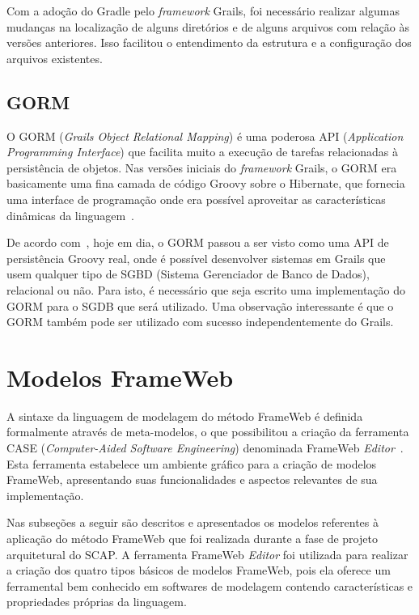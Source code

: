 Com a adoção do Gradle pelo \textit{framework} Grails, foi necessário realizar algumas mudanças na localização de alguns diretórios e de alguns arquivos com relação às versões anteriores. Isso facilitou o entendimento da estrutura e a configuração dos arquivos existentes.

\subsection{GORM}
\label{sec-projeto-gorm}

O GORM (\textit{Grails Object Relational Mapping}) é uma poderosa API (\textit{Application Programming Interface}) que facilita muito a execução de tarefas relacionadas à persistência de objetos. Nas versões iniciais do \textit{framework} Grails, o GORM era basicamente uma fina camada de código Groovy sobre o Hibernate, que fornecia uma interface de programação onde era possível aproveitar as características dinâmicas da linguagem~\cite{weissmann:fgapdw15}.

De acordo com~, hoje em dia, o GORM passou a ser visto como uma API de persistência Groovy real, onde é possível desenvolver sistemas em Grails que usem qualquer tipo de SGBD (Sistema Gerenciador de Banco de Dados), relacional ou não. Para isto, é necessário que seja escrito uma implementação do GORM para o SGDB que será utilizado. Uma observação interessante é que o GORM também pode ser utilizado com sucesso independentemente do Grails.  

\section{Modelos FrameWeb}
\label{sec-projeto-modelos-frameweb}

A sintaxe da linguagem de modelagem do método FrameWeb é definida formalmente através de meta-modelos, o que possibilitou a criação da ferramenta CASE (\textit{Computer-Aided Software Engineering}) denominada FrameWeb \textit{Editor}~\cite{campos-souza:webmedia17}. Esta ferramenta estabelece um ambiente gráfico para a criação de modelos FrameWeb, apresentando suas funcionalidades e aspectos relevantes de sua implementação.  

Nas subseções a seguir são descritos e apresentados os modelos referentes à aplicação do método FrameWeb que foi realizada durante a fase de projeto arquitetural do SCAP. A ferramenta FrameWeb \textit{Editor} foi utilizada para realizar a criação dos quatro tipos básicos de modelos FrameWeb, pois ela oferece um ferramental bem conhecido em softwares de modelagem contendo características e propriedades próprias da linguagem.  

